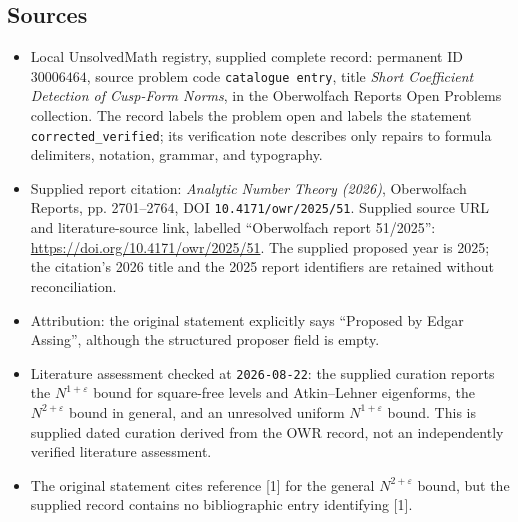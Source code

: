 \documentclass[11pt]{article}
\begin{document}
\subsection{Sources}
\begin{itemize}
\item Local UnsolvedMath registry, supplied complete record: permanent ID \(30006464\), source problem code \texttt{catalogue entry}, title \emph{Short Coefficient Detection of Cusp-Form Norms}, in the Oberwolfach Reports Open Problems collection. The record labels the problem open and labels the statement \texttt{corrected\_verified}; its verification note describes only repairs to formula delimiters, notation, grammar, and typography.
\item Supplied report citation: \emph{Analytic Number Theory (2026)}, Oberwolfach Reports, pp. 2701--2764, DOI \texttt{10.4171/owr/2025/51}. Supplied source URL and literature-source link, labelled ``Oberwolfach report 51/2025'': \url{https://doi.org/10.4171/owr/2025/51}. The supplied proposed year is 2025; the citation's 2026 title and the 2025 report identifiers are retained without reconciliation.
\item Attribution: the original statement explicitly says ``Proposed by Edgar Assing'', although the structured proposer field is empty.
\item Literature assessment checked at \texttt{2026-08-22}: the supplied curation reports the \(N^{1+\varepsilon}\) bound for square-free levels and Atkin--Lehner eigenforms, the \(N^{2+\varepsilon}\) bound in general, and an unresolved uniform \(N^{1+\varepsilon}\) bound. This is supplied dated curation derived from the OWR record, not an independently verified literature assessment.
\item The original statement cites reference [1] for the general \(N^{2+\varepsilon}\) bound, but the supplied record contains no bibliographic entry identifying [1].
\end{itemize}
\end{document}
